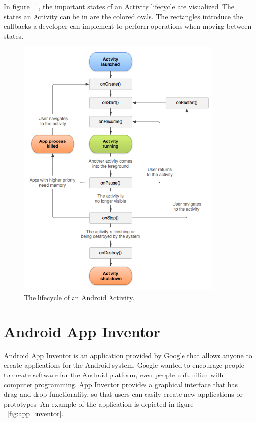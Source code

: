 In figure ~\ref{fig:activity_lifecycle}, the important states of an Activity lifecycle are visualized. The states an Activity can be in are the colored ovals. The rectangles introduce the callbacks a developer can implement to perform operations when moving between states.

\begin{figure}[h!]
\centering
\includegraphics[width=0.9\textwidth]{images/chap4_activity_lifecycle.png}
\caption{The lifecycle of an Android Activity.}
\label{fig:activity_lifecycle}
\end{figure}

\section{Android App Inventor}

Android App Inventor is an application provided by Google that allows anyone to create applications for the Android system. Google wanted to encourage people to create software for the Android platform, even people unfamiliar with computer programming. App Inventor provides a graphical interface that has drag-and-drop functionality, so that users can easily create new applications or prototypes. An example of the application is depicted in figure ~\ref{fig:app_inventor}.

